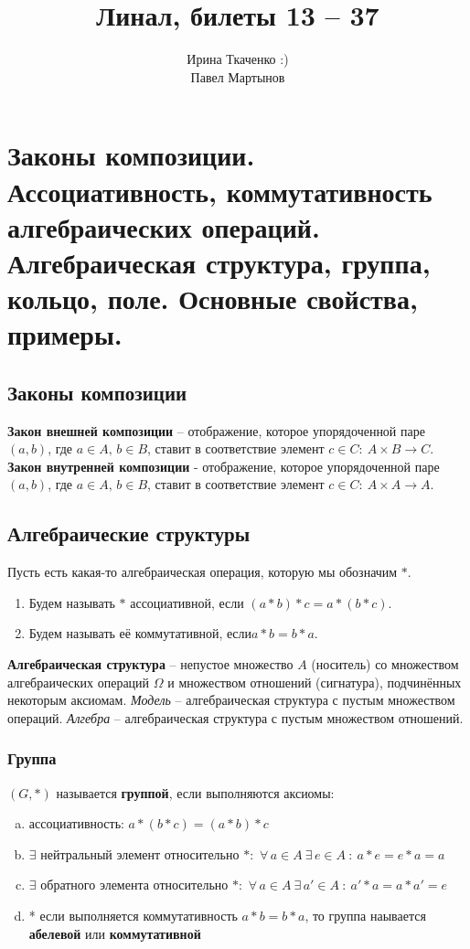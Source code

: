 \documentclass{article}
\title{Линал, билеты 13 -- 37}
\author{Ирина Ткаченко :)\\
			Павел Мартынов}
\date{}
\begin{document}
\maketitle 
\tableofcontents

\newpage
\section{Законы композиции. Ассоциативность, коммутативность алгебраических операций. Алгебраическая структура, группа, кольцо, поле. Основные свойства, примеры.}
\subsection{Законы композиции}
\textbf{Закон внешней композиции} -- отображение, которое упорядоченной паре $(a, b)$, где
$a \in A,\,b \in B$, ставит в соответствие элемент $c\in C :\: A \times B \to C$.
\newline
\newline
\textbf{Закон внутренней композиции} - отображение, которое упорядоченной паре $(a, b)$, где
$a \in A,\,b \in B$, ставит в соответствие элемент $c\in C :\: A \times A \to A$.
\newline
\newline
\subsection{Алгебраические структуры}
Пусть есть какая-то алгебраическая операция, которую мы обозначим $*$. 
\begin{enumerate}
    \item Будем называть $*$ ассоциативной, если $(a*b)*c = a*(b*c)$.
    \item Будем называть её коммутативной, $если a*b = b*a$.
\end{enumerate}
\textbf{Алгебраическая структура} -- непустое множество $A$ (носитель) со множеством алгебраических операций $\Omega$ и множеством отношений (сигнатура), подчинённых некоторым аксиомам. \textit{Модель} -- алгебраическая структура с пустым множеством операций. \textit{Алгебра} -- алгебраическая структура с пустым множеством отношений.
\subsubsection{Группа} 
$(G,*)$ называется \textbf{группой}, если выполняются аксиомы:
    \begin{enumerate}[(a)]
        \item ассоциативность: $a*(b*c)=(a*b)*c$
        \item $\exists$ нейтральный элемент относительно $*$: $\,\forall\,a\in A\:\exists\,e\in A\::\:a*e=e*a=a$
        \item $\exists$ обратного элемента относительно $*$: $\,\forall\,a\in A\:\exists\,a'\in A\::\:a'*a=a*a'=e$
        \item * если выполняется коммутативность $a*b=b*a$, то группа наывается \textbf{абелевой} или \textbf{коммутативной}
    \end{enumerate}
    \newpage
\end{document}
